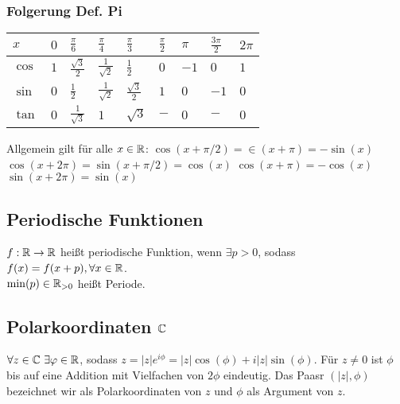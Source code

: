 \subsubsection*{Folgerung Def. Pi}
\renewcommand{\arraystretch}{1.5}
\begin{tabular}{m{1.1em}m{0.2em}m{0.2em}m{0.2em}m{0.2em}m{0.2em}m{0.2em}m{0.2em}m{0.2em}}
    $x$ & $0$& $\frac{\pi}{6}$ & $\frac{\pi}{4}$ & $\frac{\pi}{3}$ & $\frac{\pi}{2}$ & $\pi$ & $\frac{3\pi}{2}$ & $2\pi$ \\\hline
    $\cos $ & $1$ & $\frac{\sqrt{3}}{2}$       & $\frac{1}{\sqrt{2}}$ & $\frac{1}{2}$        & $0$  & $-1$ & $0$  & $1$ \\\hline
    $\sin $ & $0$ & $\frac{1}{2}$              & $\frac{1}{\sqrt{2}}$ & $\frac{\sqrt{3}}{2}$ & $1$  & $0$  & $-1$ & $0$ \\\hline
    $\tan $ & $0$ & $\frac{1}{\sqrt{3}}$       & $1                 $ & $\sqrt{3}$           & $-$    & $0$   & $-$   & $0$\\
\end{tabular}
Allgemein gilt für alle $x \in \mathbb R$:
$\cos(x + \pi/2) = \in(x + \pi) =  - \sin(x)$\\
$\cos(x + 2 \pi) = \sin(x + \pi/2) = \cos(x)$
$\cos(x + \pi) = -\cos(x)$\\
$\sin(x + 2\pi) = \sin(x)$
\renewcommand{\arraystretch}{0.5}
\subsection*{Periodische Funktionen}
$f: \mathbb R \rightarrow \mathbb R$ heißt periodische Funktion, wenn $\exists p > 0$, sodass $f(x) = f(x + p), \forall x \in \mathbb R$.\\
$\min(p) \in \mathbb R_{>0}$ heißt Periode.
\subsection*{Polarkoordinaten \texorpdfstring{$\mathbb C$}{komplexer Zahlen}}
$\forall z \in \mathbb C \ \exists \varphi \in \mathbb R$, sodass $z = |z|e^{i \phi} = |z| \cos(\phi) + i |z| \sin(\phi)$. Für $z \neq 0$ ist $\phi$ bis auf eine Addition mit Vielfachen von $2 \phi$ eindeutig. Das Paasr $(|z|, \phi)$ bezeichnet wir als Polarkoordinaten von $z$ und $\phi$ als Argument von $z$.